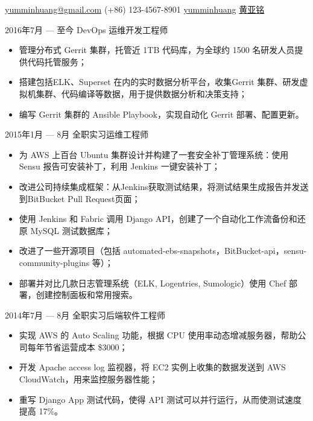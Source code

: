 \documentclass{newresume}
\begin{document}
{\href{mailto:yumminhuang@gmail.com}{yumminhuang@gmail.com}}
{(+86) 123-4567-8901}
{\href{https://github.com/yumminhuang}{yumminhuang}}
{\href{https://www.linkedin.com/in/yaming-huang-6a09325b/zh-cn}{黄亚铭}}
{}


\begin{body}
	{2016年7月 --- 至今}
	{DevOps 运维开发工程师}{}
	\begin{itemize}[noitemsep,topsep=0pt]
		\item 管理分布式 Gerrit 集群，托管近 1TB 代码库，为全球约 1500 名研发人员提供代码托管服务；
		\item 搭建包括ELK、Superset 在内的实时数据分析平台，收集Gerrit 集群、研发虚拟机集群、代码编译等数据，用于提供数据分析和决策支持；
		\item 编写 Gerrit 集群的 Ansible Playbook，实现自动化 Gerrit 部署、配置更新。
	\end{itemize}
\end{body}

\begin{body}
	{2015年1月 --- 8月}
	{全职实习运维工程师}{}
	\begin{itemize}[noitemsep,topsep=0pt]
		\item 为 AWS 上百台 Ubuntu 集群设计并构建了一套安全补丁管理系统：使用 Sensu 报告可安装补丁，利用 Jenkins 一键安装补丁；
		\item 改进公司持续集成框架：从Jenkins获取测试结果，将测试结果生成报告并发送到BitBucket Pull Request页面；
		\item 使用 Jenkins 和 Fabric 调用 Django API，创建了一个自动化工作流备份和还原 MySQL 测试数据库；
		\item 改进了一些开源项目（包括 automated-ebs-snapshots，BitBucket-api，sensu-community-plugins 等）；
		\item 部署并对比几款日志管理系统（ELK, Logentries, Sumologic）使用 Chef 部署，创建控制面板和常用搜索。
	\end{itemize}
\end{body}

\begin{body}
	{2014年7月 --- 8月}
	{全职实习后端软件工程师}{}
	\begin{itemize}[noitemsep,topsep=0pt]
		\item 实现 AWS 的 Auto Scaling 功能，根据 CPU 使用率动态增减服务器，帮助公司每年节省运营成本 \$3000；
		\item 开发 Apache access log 监视器，将 EC2 实例上收集的数据发送到 AWS CloudWatch，用来监控服务器性能；
		\item 重写 Django App 测试代码，使得 API 测试可以并行运行，从而使测试速度提高 17\%。
	\end{itemize}
\end{body}
\end{document}
